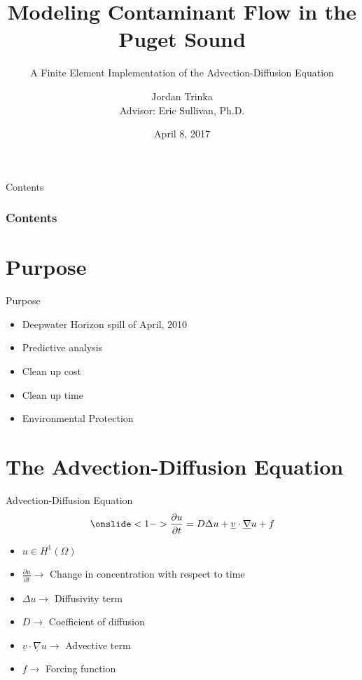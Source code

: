 \documentclass[10pt]{beamer}
\author{Jordan Trinka\\ Advisor: Eric Sullivan, Ph.D.}
\title[Short Title]{ Modeling Contaminant Flow in the \\Puget Sound}
\subtitle{A Finite Element Implementation of the Advection-Diffusion Equation} %
\date{April 8, 2017} %
\begin{document}
\begin{frame}[t,plain]
    \titlepage
\end{frame}

\begin{frame}{Contents}
\frametitle{Contents}
    \tableofcontents[
]
\end{frame}

\section{Purpose}

\begin{frame}{Purpose} \label{Purpose}
\begin{itemize}
\item<1-> Deepwater Horizon spill of April, 2010
\item<2-> Predictive analysis
\item<3-> Clean up cost
\item<4-> Clean up time
\item<5->Environmental Protection
\end{itemize}
\hyperlink{Questions}{}
\end{frame}

\section{The Advection-Diffusion Equation} 
\begin{frame}{Advection-Diffusion Equation}\label{The Advection-Diffusion Equation}
\begin{equation}\onslide<1->
\frac{\partial u}{\partial t}= D\Delta u + \underline{v} \cdot \underline{\nabla}u+f
\end{equation}
\begin{itemize}
\item <2->$u \in  H^{1}\left(\Omega \right)$
\item <3->$\frac{\partial u}{\partial t} \rightarrow$ Change in concentration with respect to time
\item <4->$\Delta u \rightarrow$ Diffusivity term
\item <5->$D \rightarrow$ Coefficient of diffusion
\item<6->$\underline{v} \cdot \underline{\nabla}u \rightarrow$ Advective term
\item <7->$f \rightarrow$ Forcing function 
\end{itemize}
\hyperlink{Questions}{}
\end{frame}
\end{document}

